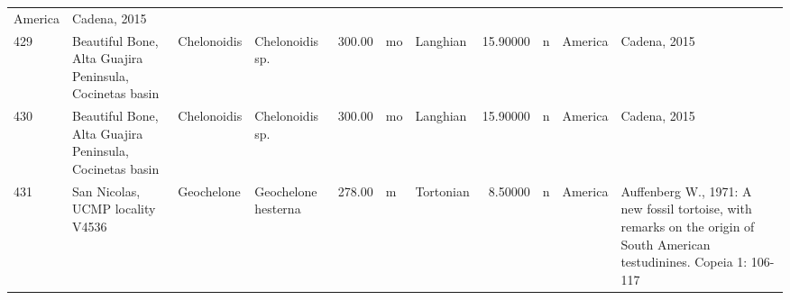 \begin{landscape}
{\begin{longtable}[]{@{}llllrllrlll@{}}
	America & Cadena, 2015\tabularnewline
	429 & Beautiful Bone, Alta Guajira Peninsula, Cocinetas basin &
	Chelonoidis & Chelonoidis sp. & 300.00 & mo & Langhian & 15.90000 & n &
	America & Cadena, 2015\tabularnewline
	430 & Beautiful Bone, Alta Guajira Peninsula, Cocinetas basin &
	Chelonoidis & Chelonoidis sp. & 300.00 & mo & Langhian & 15.90000 & n &
	America & Cadena, 2015\tabularnewline
	431 & San Nicolas, UCMP locality V4536 & Geochelone & Geochelone
	hesterna & 278.00 & m & Tortonian & 8.50000 & n & America & Auffenberg
	W., 1971: A new fossil tortoise, with remarks on the origin of South
	American testudinines. Copeia 1: 106-117\tabularnewline
	\bottomrule
\end{longtable}
}

\end{landscape}